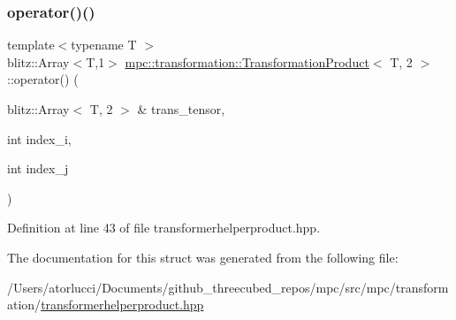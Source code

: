 \subsubsection{\texorpdfstring{operator()()}{operator()()}}
{\footnotesize\ttfamily template$<$typename T $>$ \\
blitz\+::\+Array$<$T,1$>$ \mbox{\hyperlink{structmpc_1_1transformation_1_1_transformation_product}{mpc\+::transformation\+::\+Transformation\+Product}}$<$ T, 2 $>$\+::operator() (\begin{DoxyParamCaption}\item[{blitz\+::\+Array$<$ T, 2 $>$ \&}]{trans\+\_\+tensor,  }\item[{int}]{index\+\_\+i,  }\item[{int}]{index\+\_\+j }\end{DoxyParamCaption})\hspace{0.3cm}{\ttfamily [inline]}}



Definition at line 43 of file transformerhelperproduct.\+hpp.



The documentation for this struct was generated from the following file\+:\begin{DoxyCompactItemize}
\item 
/\+Users/atorlucci/\+Documents/github\+\_\+threecubed\+\_\+repos/mpc/src/mpc/transformation/\mbox{\hyperlink{transformerhelperproduct_8hpp}{transformerhelperproduct.\+hpp}}\end{DoxyCompactItemize}
